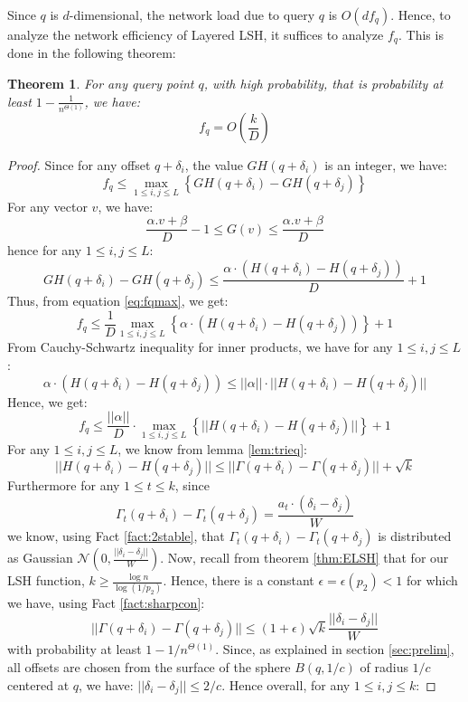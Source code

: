 \documentclass{acm_proc_article-sp}
\numberwithin{equation}{section}
\numberwithin{figure}{section}
\newtheorem{thm}{Theorem}
\begin{document}
Since $q$ is $d$-dimensional, the network load due to query $q$ is $O(df_q)$. Hence, to analyze the network efficiency of Layered LSH, it suffices to analyze $f_q$. This is done in the following theorem:
\begin{thm} \label{thm:fq} For any query point $q$, with high probability, that is probability at least $1-\frac{1}{n^{\Theta(1)}}$, we have: $$f_q=O(\frac{k}{D})$$
\end{thm}
\begin{proof}
Since for any offset $q+\delta_i$, the value $GH(q+\delta_i)$ is an integer, we have: 
\begin{equation} \label{eq:fqmax}
f_q \leq \max_{1\leq i,j \leq L} \left\{GH(q+\delta_i)-GH(q+\delta_j)\right\}
\end{equation}
For any vector $v$, we have: $$\frac{\alpha.v+\beta}{D} -1 \leq G(v) \leq \frac{\alpha.v+\beta}{D}$$ hence for any $1\leq i,j\leq L$: $$GH(q+\delta_i)-GH(q+\delta_j) \leq \frac{\alpha\cdot (H(q+\delta_i)-H(q+\delta_j))}{D}+1$$
Thus, from equation \ref{eq:fqmax}, we get:
\[
f_q \leq \frac{1}{D} \max_{1\leq i,j \leq L} \left\{\alpha\cdot (H(q+\delta_i)-H(q+\delta_j)) \right\}+1
\]
From Cauchy-Schwartz inequality for inner products, we have for any $1\leq i,j\leq L$:
\[
\alpha\cdot (H(q+\delta_i)-H(q+\delta_j)) \leq ||\alpha|| \cdot ||H(q+\delta_i)-H(q+\delta_j)||
\]
Hence, we get:
\begin{equation}
\label{eq:fqnorms}
f_q \leq \frac{||\alpha||}{D} \cdot \max_{1\leq i,j \leq L} \left\{||H(q+\delta_i)-H(q+\delta_j)|| \right\}+1
\end{equation}
For any $1\leq i,j\leq L$, we know from lemma \ref{lem:trieq}: 
\begin{equation}
\label{eq:HGamma}
||H(q+\delta_i)-H(q+\delta_j)|| \leq ||\Gamma(q+\delta_i)-\Gamma(q+\delta_j)|| + \sqrt{k}
\end{equation}
Furthermore for any $1\leq t\leq k$, since
$$\Gamma_t(q+\delta_i) - \Gamma_t(q+\delta_j) = \frac{a_t\cdot (\delta_i-\delta_j)}{W}$$
we know, using Fact \ref{fact:2stable}, that $\Gamma_t(q+\delta_i) - \Gamma_t(q+\delta_j)$ is distributed as Gaussian $\mathcal{N}(0,\frac{||\delta_i-\delta_j||}{W})$. Now, recall from theorem \ref{thm:ELSH} that for our LSH function, $k\geq \frac{\log n}{\log (1/p_2)}$. Hence, there is a constant $\epsilon = \epsilon(p_2) <1$ for which we have, using Fact \ref{fact:sharpcon}: 
\[
||\Gamma(q+\delta_i) - \Gamma(q+\delta_j)|| \leq (1+\epsilon)\sqrt{k}\frac{||\delta_i-\delta_j||}{W}
\]
with probability at least $1-1/n^{\Theta(1)}$. Since, as explained in section \ref{sec:prelim}, all offsets are chosen from the surface of the sphere $B(q,1/c)$ of radius $1/c$ centered at $q$, we have: $||\delta_i-\delta_j||\leq 2/c$. Hence overall, for any $1\leq i,j\leq k$:

\end{proof}
\end{document}
